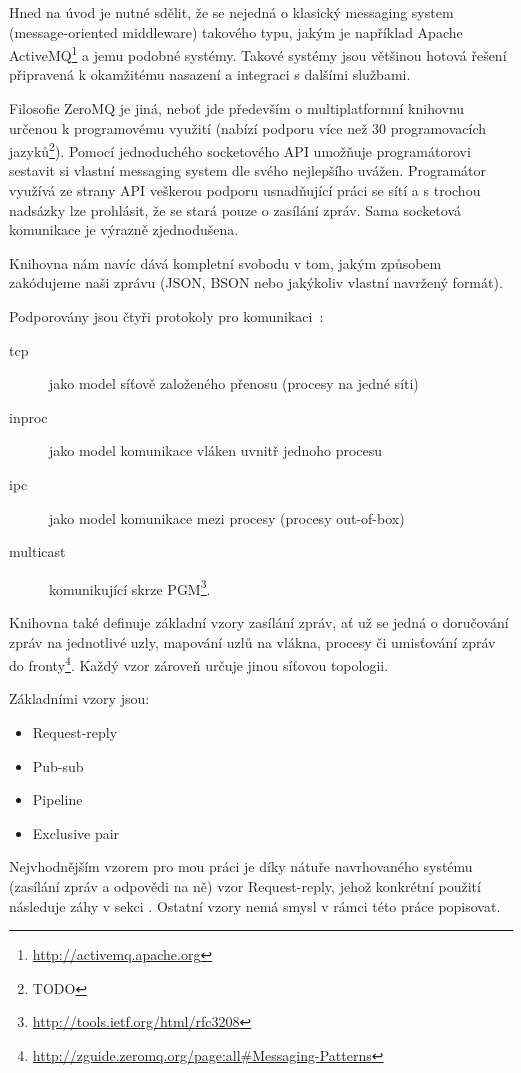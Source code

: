 \documentclass[thesis=M,czech]{FITthesis}[2014/05/07]
\begin{document}
Hned na úvod je nutné sdělit, že se nejedná o klasický messaging system (message-oriented middleware) takového typu, jakým je například Apache ActiveMQ\footnote{\url{http://activemq.apache.org}} a jemu podobné systémy. Takové systémy jsou většinou hotová řešení připravená k okamžitému nasazení a integraci s dalšími službami. 

Filosofie ZeroMQ je jiná, neboť jde především o multiplatformní knihovnu určenou k programovému využití (nabízí podporu více než 30 programovacích jazyků\footnote{TODO}). Pomocí jednoduchého socketového API umožňuje programátorovi sestavit si vlastní messaging system dle svého nejlepšího uvážen. Programátor využívá ze strany API veškerou podporu usnadňující práci se sítí a s trochou nadsázky lze prohlásit, že se stará pouze o zasílání zpráv. Sama socketová komunikace je výrazně zjednodušena.

Knihovna nám navíc dává kompletní svobodu v tom, jakým způsobem zakódujeme naši zprávu (JSON, BSON nebo jakýkoliv vlastní navržený formát).

Podporovány jsou čtyři protokoly pro komunikaci~\cite{zeromq1}:

\begin{description}
	\item[tcp] jako model síťově založeného přenosu (procesy na jedné síti)
	\item[inproc] jako model komunikace vláken uvnitř jednoho procesu
	\item[ipc] jako model komunikace mezi procesy (procesy out-of-box)
	\item[multicast]	komunikující skrze PGM\footnote{\url{http://tools.ietf.org/html/rfc3208}}.
\end{description}

Knihovna také definuje základní vzory zasílání zpráv, ať už se jedná o doručování zpráv na jednotlivé uzly, mapování uzlů na vlákna, procesy či umisťování zpráv do fronty\footnote{\url{http://zguide.zeromq.org/page:all\#Messaging-Patterns}}. Každý vzor zároveň určuje jinou síťovou topologii.

Základními vzory jsou:

\begin{itemize}
	\item Request-reply
	\item Pub-sub
	\item Pipeline		
	\item Exclusive pair
\end{itemize}

Nejvhodnějším vzorem pro mou práci je díky nátuře navrhovaného systému (zasílání zpráv a odpovědi na ně) vzor Request-reply, jehož konkrétní použití následuje záhy v sekci . Ostatní vzory nemá smysl v rámci této práce popisovat.
\end{document}

